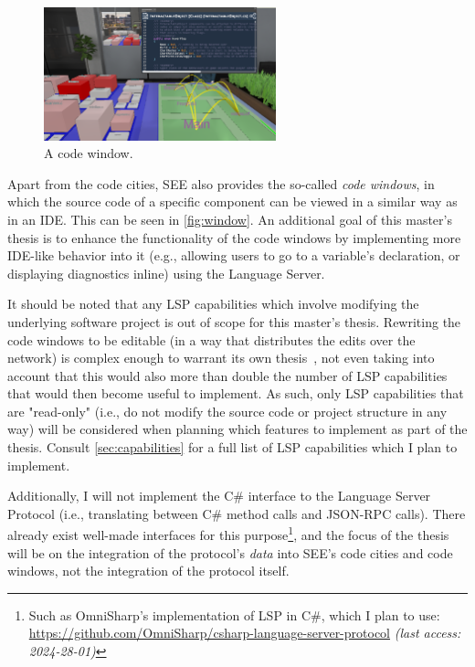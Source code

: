 \documentclass{scrartcl}
\newcommand{\SEE}{\textsc{SEE}}
\newcommand{\web}[2]{\url{#1} \textit{(last access: #2)}}
\begin{document}
{\begin{figure}
    \centering
    \includegraphics[width=0.6\textwidth,trim={30.5cm 22cm 6cm 0},clip]{figures/SEE_readme}
    \caption{A code window.}\label{fig:window}
\end{figure}

Apart from the code cities, \SEE{} also provides the so-called \emph{code windows}, in which the source code of a specific component can be viewed in a similar way as in an IDE.
This can be seen in \autoref{fig:window}.
An additional goal of this master's thesis is to enhance the functionality of the code windows by implementing more IDE-like behavior into it (e.g., allowing users to go to a variable's declaration, or displaying diagnostics inline) using the Language Server.

It should be noted that any LSP capabilities which involve modifying the underlying software project is out of scope for this master's thesis.
Rewriting the code windows to be editable (in a way that distributes the edits over the network) is complex enough to warrant its own thesis~\cite[see also][]{moritz}, not even taking into account that this would also more than double the number of LSP capabilities that would then become useful to implement.
As such, only LSP capabilities that are "read-only" (i.e., do not modify the source code or project structure in any way) will be considered when planning which features to implement as part of the thesis.
Consult \autoref{sec:capabilities} for a full list of LSP capabilities which I plan to implement.

Additionally, I will not implement the C\# interface to the Language Server Protocol (i.e., translating between C\# method calls and JSON-RPC calls).
There already exist well-made interfaces for this purpose\footnote{
  Such as OmniSharp's implementation of LSP in C\#, which I plan to use:
  \web{https://github.com/OmniSharp/csharp-language-server-protocol}{2024-28-01}
}, and the focus of the thesis will be on the integration of the protocol's \emph{data} into \SEE{}'s code cities and code windows, not the integration of the protocol itself.

}
\end{document}
